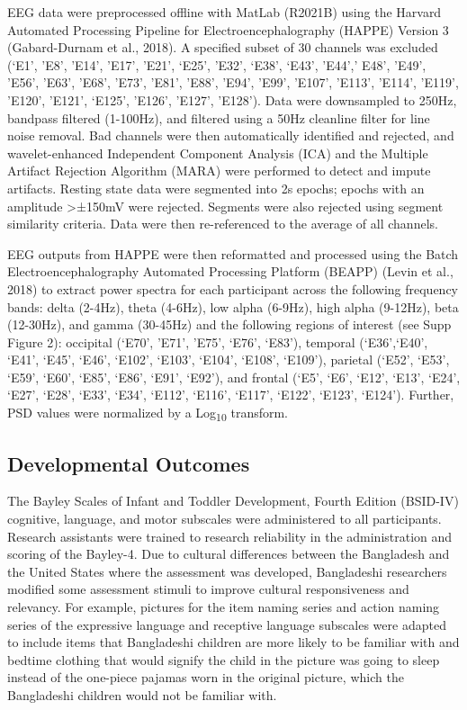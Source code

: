 \documentclass{article}
\begin{document}
EEG data were preprocessed offline with MatLab (R2021B) using the Harvard Automated Processing Pipeline for Electroencephalography (HAPPE) Version 3 (Gabard-Durnam et al., 2018).
A specified subset of 30 channels was excluded (‘E1’, ’E8’, ’E14’, ’E17’, ’E21’, ‘E25’, ’E32’, ‘E38’, ‘E43’, ’E44’,’ E48’, ’E49’, ’E56’, ’E63’, ’E68’, ’E73’, ’E81’, ’E88’, ’E94’, ’E99’, ’E107’, ’E113’, ’E114’, ’E119’, ’E120’, ’E121’, ‘E125', 'E126', 'E127', 'E128').
Data were downsampled to 250Hz, bandpass filtered (1-100Hz), and filtered using a 50Hz cleanline filter for line noise removal.
Bad channels were then automatically identified and rejected, and wavelet-enhanced Independent Component Analysis (ICA) and the Multiple Artifact Rejection Algorithm (MARA) were performed to detect and impute artifacts.
Resting state data were segmented into 2s epochs; epochs with an amplitude >±150mV were rejected.
Segments were also rejected using segment similarity criteria.
Data were then re-referenced to the average of all channels.

EEG outputs from HAPPE were then reformatted and processed using the Batch Electroencephalography Automated Processing Platform (BEAPP) (Levin et al., 2018) to extract power spectra for each participant across the following frequency bands: delta (2-4Hz), theta (4-6Hz), low alpha (6-9Hz), high alpha (9-12Hz), beta (12-30Hz), and gamma (30-45Hz) and the following regions of interest (see Supp Figure 2): occipital (‘E70’, ’E71’, ’E75’, ‘E76’, ‘E83’), temporal (‘E36’,‘E40’, ‘E41’, ‘E45’, ‘E46’, ‘E102’, ‘E103’, ‘E104’, ‘E108’, ‘E109’), parietal (‘E52’, ‘E53’, ‘E59’, ‘E60’, ‘E85’, ‘E86’, ‘E91’, ‘E92’), and frontal (‘E5’, ‘E6’, ‘E12’, ‘E13’, ‘E24’, ‘E27’, ‘E28’, ‘E33’, ‘E34’, ‘E112’, ‘E116’, ‘E117’, ‘E122’, ‘E123’, ‘E124’).
Further, PSD values were normalized by a Log\textsubscript{10} transform.

\subsection{Developmental Outcomes} 
The Bayley Scales of Infant and Toddler Development, Fourth Edition (BSID-IV) cognitive, language, and motor subscales were administered to all participants.
Research assistants were trained to research reliability in the administration and scoring of the Bayley-4.
Due to cultural differences between the Bangladesh and the United States where the assessment was developed, Bangladeshi researchers modified some assessment stimuli to improve cultural responsiveness and relevancy.
For example, pictures for the item naming series and action naming series of the expressive language and receptive language subscales were adapted to include items that Bangladeshi children are more likely to be familiar with and bedtime clothing that would signify the child in the picture was going to sleep instead of the one-piece pajamas worn in the original picture, which the Bangladeshi children would not be familiar with. 
\end{document}
